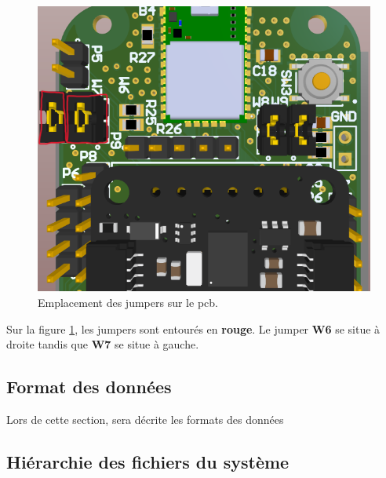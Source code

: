 \begin{figure}[h]
	\centering
	\includegraphics[width=0.5\linewidth]{../figures/code/config-mode-IMU}
	\caption{Emplacement des jumpers sur le \gls{pcb}.}
	\label{fig:config-mode-imu}
\end{figure}

Sur la figure \ref{fig:config-mode-imu}, les jumpers sont entourés en \textbf{rouge}. Le jumper \textbf{W6} se situe à droite tandis que \textbf{W7} se situe à gauche.

\clearpage	

\subsection{Format des données}

Lors de cette section, sera décrite les formats des données

\subsection{Hiérarchie des fichiers du système}




